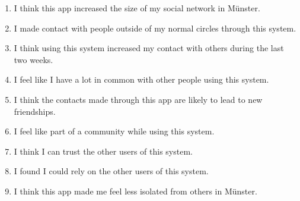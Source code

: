 \begin{enumerate}
    \item I think this app increased the size of my social network in Münster.
    \item I made contact with people outside of my normal circles through this system.
    \item I think using this system increased my contact with others during the last two weeks.
    \item I feel like I have a lot in common with other people using this system.
    \item I think the contacts made through this app are likely to lead to new friendships.
    \item I feel like part of a community while using this system.
    \item I think I can trust the other users of this system.
    \item I found I could rely on the other users of this system.
    \item I think this app made me feel less isolated from others in Münster.
\end{enumerate}
